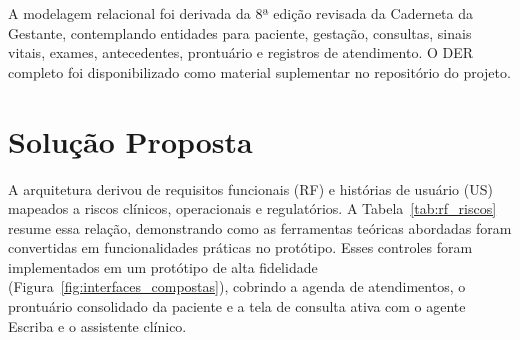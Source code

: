 \documentclass[12pt]{article}
\begin{document}
A modelagem relacional foi derivada da 8ª edição revisada da Caderneta da Gestante, contemplando entidades para paciente, gestação, consultas, sinais vitais, exames, antecedentes, prontuário e registros de atendimento.
O DER completo foi disponibilizado como material suplementar no repositório do projeto.



\section{Solução Proposta}

A arquitetura derivou de requisitos funcionais (RF) e histórias de usuário (US) mapeados a riscos clínicos, operacionais e regulatórios.
A Tabela~\ref{tab:rf_riscos} resume essa relação, demonstrando como as ferramentas teóricas abordadas foram convertidas em funcionalidades práticas no protótipo.
Esses controles foram implementados em um protótipo de alta fidelidade (Figura~\ref{fig:interfaces_compostas}), cobrindo a agenda de atendimentos, o prontuário consolidado da paciente e a tela de consulta ativa com o agente Escriba e o assistente clínico.

\begin{table}[htbp]
  \centering
  \caption{Requisitos, riscos mitigados e mecanismos de controle.}\label{tab:rf_riscos}
  \scriptsize
\end{table}
\end{document}
